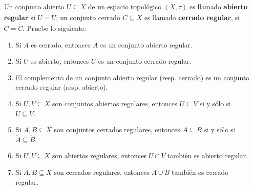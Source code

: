 \documentclass[12pt]{report}
\theoremstyle{largebreak}
\newcommand{\Int}[1]{\ensuremath{\mathring{#1}}}
\newcommand{\Cls}[1]{\ensuremath{\overline{#1}}}
\begin{document}
    \begin{excer}
        
    \end{excer}

    \begin{excer}
        Un conjunto abierto $U\subseteq X$ de un espacio topológico $(X,\tau)$ es llamado \textbf{abierto regular} si $U=\Int{\Cls{U}}$; un conjunto cerrado $C\subseteq X$ es llamado \textbf{cerrado regular}, si $C=\Cls{\Int{C}}$. Pruebe lo siguiente:
        \begin{enumerate}
            \item Si $A$ es cerrado, entonces $\Int{A}$ es un conjunto abierto regular.
            \item Si $U$ es abierto, entonces $\Cls{U}$ es un conjunto cerrado regular.
            \item El complemento de un conjunto abierto regular (resp. cerrado) es un conjunto cerrado regular (resp. abierto).
            \item Si $U,V\subseteq X$ son conjuntos abiertos regulares, entonces $U\subseteq V$ si y sólo si $\Cls{U}\subseteq \Cls{V}$.
            \item Si $A,B\subseteq X$ son conjuntos cerrados regulares, entonces $A\subseteq B$ si y sólo si $\Int{A}\subseteq \Int{B}$.
            \item Si $U,V\subseteq X$ son abiertos regulares, entonces $U\cap V$ también es abierto regular.
            \item Si $A,B\subseteq X$ son cerrados regulares, entonces $A\cup B$ también es cerrado regular.
        \end{enumerate}
    \end{excer}
\end{document}

